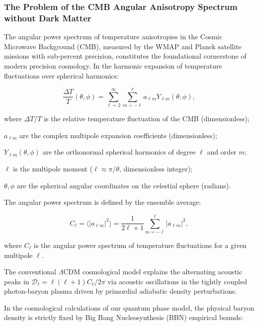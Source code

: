 \subsubsection{The Problem of the CMB Angular Anisotropy Spectrum without Dark Matter}\label{sec:4.4.1}

The angular power spectrum of temperature anisotropies in the Cosmic Microwave Background (CMB), measured by the WMAP and Planck satellite missions with sub-percent precision, constitutes the foundational cornerstone of modern precision cosmology. In the harmonic expansion of temperature fluctuations over spherical harmonics:

\begin{equation}\label{eq:4.39}\tag{4.39}
\frac{\Delta T}{T}(\theta, \phi) = \sum_{\ell=2}^{\infty} \sum_{m=-\ell}^{\ell} a_{\ell m} Y_{\ell m}(\theta, \phi),
\end{equation}

where $\Delta T / T$ is the relative temperature fluctuation of the CMB (dimensionless);  

$a_{\ell m}$ are the complex multipole expansion coefficients (dimensionless);  

$Y_{\ell m}(\theta, \phi)$ are the orthonormal spherical harmonics of degree $\ell$ and order $m$;  

$\ell$ is the multipole moment ($\ell \approx \pi / \theta$, dimensionless integer);  

$\theta, \phi$ are the spherical angular coordinates on the celestial sphere (radians).

The angular power spectrum is defined by the ensemble average:

\begin{equation}\label{eq:4.40}\tag{4.40}
C_\ell = \langle |a_{\ell m}|^2 \rangle = \frac{1}{2\ell+1} \sum_{m=-\ell}^\ell |a_{\ell m}|^2,
\end{equation}

where $C_\ell$ is the angular power spectrum of temperature fluctuations for a given multipole $\ell$.

The conventional $\Lambda\text{CDM}$ cosmological model explains the alternating acoustic peaks in $\mathcal{D}_\ell = \ell(\ell+1)C_\ell / 2\pi$ via acoustic oscillations in the tightly coupled photon-baryon plasma driven by primordial adiabatic density perturbations.

In the cosmological calculations of our quantum phase model, the physical baryon density is strictly fixed by Big Bang Nucleosynthesis (BBN) empirical bounds:

